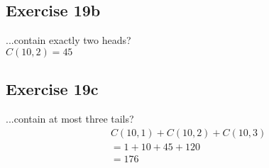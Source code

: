 \documentclass[12pt]{article}
\begin{document}
    \subsection{Exercise 19b}
    ...contain exactly two heads?\\
    $C(10,2)=45$

    \subsection{Exercise 19c}
    ...contain at most three tails?
    \begin{equation}
      \begin{split}
        &C(10,1)+C(10,2)+C(10,3)\\
        &=1+10+45+120\\
        &=176        
      \end{split}
    \end{equation}
\end{document}
